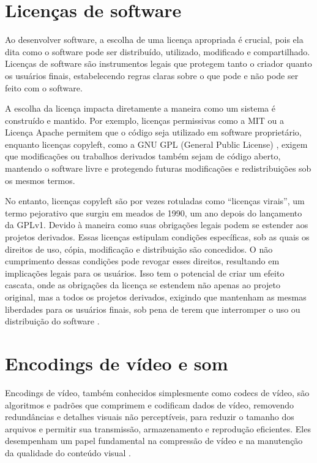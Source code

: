 \documentclass[12pt, %
openright, 
oneside, %
a4paper,    %
brazil]{facom-ufu-abntex2}
\begin{document}
\section{Licenças de software}

Ao desenvolver software, a escolha de uma licença apropriada é crucial, pois
ela dita como o software pode ser distribuído, utilizado, modificado e
compartilhado. Licenças de software são instrumentos legais que protegem tanto
o criador quanto os usuários finais, estabelecendo regras claras sobre o que
pode e não pode ser feito com o software.

A escolha da licença impacta diretamente a maneira como um sistema é construído
e mantido. Por exemplo, licenças permissivas como a MIT
\cite{OpenSourceInitiative} ou a Licença Apache \cite{ApacheLicense2004}
permitem que o código seja utilizado em software proprietário, enquanto
licenças copyleft, como a GNU GPL (General Public License) \cite{gnu_gpl},
exigem que modificações ou trabalhos derivados também sejam de código aberto,
mantendo o software livre e protegendo futuras modificações e redistribuições
sob os mesmos termos.

No entanto, licenças copyleft são por vezes rotuladas como ``licenças virais'',
um termo pejorativo que surgiu em meados de 1990, um ano depois do lançamento
da GPLv1. Devido à maneira como suas obrigações legais podem se estender aos
projetos derivados. Essas licenças estipulam condições específicas, sob as
quais os direitos de uso, cópia, modificação e distribuição são concedidos. O
não cumprimento dessas condições pode revogar esses direitos, resultando em
implicações legais para os usuários. Isso tem o potencial de criar um efeito
cascata, onde as obrigações da licença se estendem não apenas ao projeto
original, mas a todos os projetos derivados, exigindo que mantenham as mesmas
liberdades para os usuários finais, sob pena de terem que interromper o uso ou
distribuição do software \cite{Golden2005}.

\section{Encodings de vídeo e som}

Encodings de vídeo, também conhecidos simplesmente como codecs de vídeo, são
algoritmos e padrões que comprimem e codificam dados de vídeo, removendo
redundâncias e detalhes visuais não perceptíveis, para reduzir o tamanho dos
arquivos e permitir sua transmissão, armazenamento e reprodução eficientes.
Eles desempenham um papel fundamental na compressão de vídeo e na manutenção da
qualidade do conteúdo visual \cite{CodecMerriamWebster2019}.
\end{document}
